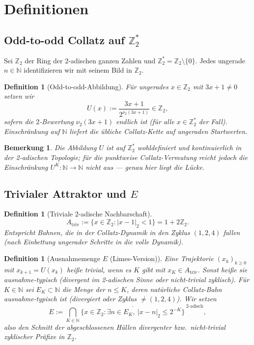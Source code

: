 \documentclass[12pt,a4paper]{article}
\newtheorem{definition}[satz]{Definition}
\newtheorem{bemerkung}[satz]{Bemerkung}
\newcommand{\vii}{\nu_2}
\newcommand{\N}{\mathbb{N}}
\newcommand{\Ztwo}{\mathbb{Z}_2}
\newcommand{\Ztwost}{\mathbb{Z}_2^{\ast}}
\begin{document}
\section{Definitionen}
\label{sec:def}

\subsection{Odd-to-odd Collatz auf $\Ztwost$}

Sei $\Ztwo$ der Ring der 2-adischen ganzen Zahlen und
$\Ztwost=\Ztwo\setminus\{0\}$.
Jedes ungerade $n\in\N$ identifizieren wir mit seinem Bild in $\Ztwo$.

\begin{definition}[Odd-to-odd-Abbildung]
\label{def:U}
F\"ur ungerades $x\in\Ztwo$ mit $3x+1\neq 0$ setzen wir
\[
  U(x):=\frac{3x+1}{2^{\vii(3x+1)}}\in\Ztwo,
\]
sofern die $2$-Bewertung $\vii(3x+1)$ endlich ist (f\"ur alle $x\in\Ztwost$ der Fall).
Einschr\"ankung auf $\N$ liefert die \"ubliche Collatz-Kette auf ungeraden Startwerten.
\end{definition}

\begin{bemerkung}
Die Abbildung $U$ ist auf $\Ztwost$ wohldefiniert und kontinuierlich in der
2-adischen Topologie; f\"ur die punktweise Collatz-Vermutung reicht jedoch
die Einschr\"ankung $U^K:\N\to\N$ nicht aus --- genau hier liegt die L\"ucke.
\end{bemerkung}

\subsection{Trivialer Attraktor und $E$}

\begin{definition}[Triviale 2-adische Nachbarschaft]
\[
  A_{\mathrm{triv}}:=\{x\in\Ztwo : |x-1|_2 < 1\}
  = 1+2\Ztwo .
\]
Entspricht Bahnen, die in der Collatz-Dynamik in den Zyklus $(1,2,4)$ fallen
(nach Einbettung ungerader Schritte in die volle Dynamik).
\end{definition}

\begin{definition}[Ausnahmemenge $E$ (Limes-Version)]
\label{def:E}
Eine Trajektorie $(x_k)_{k\geq 0}$ mit $x_{k+1}=U(x_k)$ hei\ss e
\emph{trivial}, wenn es $K$ gibt mit $x_K\in A_{\mathrm{triv}}$.
Sonst hei\ss e sie \emph{ausnahme-typisch} (divergent im 2-adischen Sinne
oder nicht-trivial zyklisch).
F\"ur $K\in\N$ sei $E_K\subset\N$ die Menge der $n\leq K$, deren
\emph{nat\"urliche} Collatz-Bahn ausnahme-typisch ist (divergiert oder
Zyklus $\neq(1,2,4)$).
Wir setzen
\[
  E:=\bigcap_{K\in\N}\overline{\{x\in\Ztwo : \exists n\in E_K,\ |x-n|_2\leq 2^{-K}\}}^{\;2\text{-adisch}},
\]
also den Schnitt der abgeschlossenen H\"ullen divergenter bzw.\ nicht-trivial
zyklischer Pr\"afixe in $\Ztwo$.
\end{definition}
\end{document}

